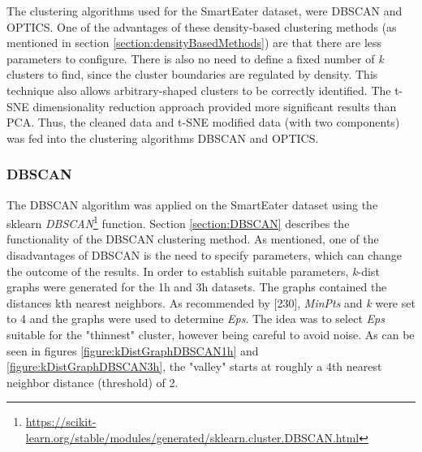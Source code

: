 The clustering algorithms used for the SmartEater dataset, were DBSCAN and OPTICS. One of the advantages of these density-based clustering methods (as mentioned in section \ref{section:densityBasedMethods}) are that there are less parameters to configure. There is also no need to define a fixed number of \textit{k} clusters to find, since the cluster boundaries are regulated by density. This technique also allows arbitrary-shaped clusters to be correctly identified. The t-SNE dimensionality reduction approach provided more significant results than PCA. Thus, the cleaned data and t-SNE modified data (with two components) was fed into the clustering algorithms DBSCAN and OPTICS.

\subsubsection{DBSCAN}
The DBSCAN algorithm was applied on the SmartEater dataset using the sklearn \textit{DBSCAN}\footnote{\url{https://scikit-learn.org/stable/modules/generated/sklearn.cluster.DBSCAN.html}} function.
Section \ref{section:DBSCAN} describes the functionality of the DBSCAN clustering method. As mentioned, one of the disadvantages of DBSCAN is the need to specify parameters, which can change the outcome of the results. In order to establish suitable parameters, \textit{k}-dist graphs were generated for the 1h and 3h datasets. The graphs contained the distances kth nearest neighbors. As recommended by \textcite{DBSCAN}[230], \textit{MinPts} and \textit{k} were set to 4 and the graphs were used to determine \textit{Eps}. The idea was to select \textit{Eps} suitable for the "thinnest" cluster, however being careful to avoid noise. As can be seen in figures \ref{figure:kDistGraphDBSCAN1h} and \ref{figure:kDistGraphDBSCAN3h}, the "valley" starts at roughly a 4th nearest neighbor distance (threshold) of 2. 


